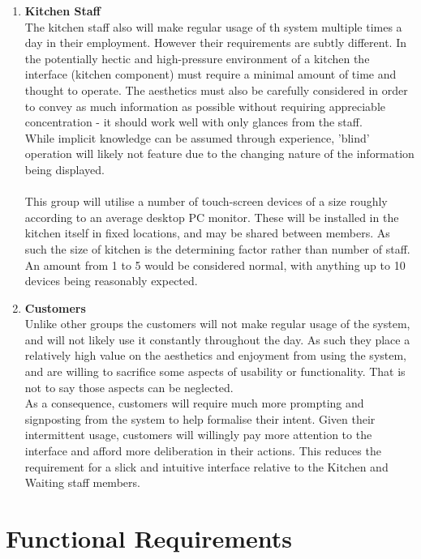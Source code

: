 \documentclass[11pt, a4paper]{report}
\begin{document}
\begin{enumerate}
\item \textbf{Kitchen Staff}\\
The kitchen staff also will make regular usage of th system multiple times a day in their employment. However their requirements are subtly different. In the potentially hectic and high-pressure environment of a kitchen the interface (kitchen component) must require a minimal amount of time and thought to operate. The aesthetics must also be carefully considered in order to convey as much information as possible without requiring appreciable concentration - it should work well with only glances from the staff.\\
While implicit knowledge can be assumed through experience, 'blind' operation will likely not feature due to the changing nature of the information being displayed.\\ 
\\
This group will utilise a number of touch-screen devices of a size roughly according to an average desktop PC monitor. These will be installed in the kitchen itself in fixed locations, and may be shared between members. As such the size of kitchen is the determining factor rather than number of staff. An amount from 1 to 5 would be considered normal, with anything up to 10 devices being reasonably expected.


\item \textbf{Customers}\\
Unlike other groups the customers will not make regular usage of the system, and will not likely use it constantly throughout the day. As such they place a relatively high value on the aesthetics and enjoyment from using the system, and are willing to sacrifice some aspects of usability or functionality. That is not to say those aspects can be neglected.\\
As a consequence, customers will require much more prompting and signposting from the system to help formalise their intent. Given their intermittent usage, customers will willingly pay more attention to the interface and afford more deliberation in their actions. This reduces the requirement for a slick and intuitive interface relative to the Kitchen and Waiting staff members.
\end{enumerate}







\section{Functional Requirements} \label{sec:Functional}
\end{document}
